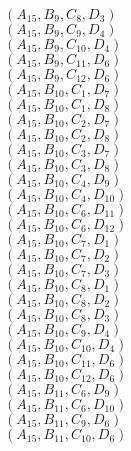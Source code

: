 \documentclass[14pt]{article}
\begin{document}
    $({A}_{15}, {B}_{9}, {C}_{8}, {D}_{3}) $ \\ 
    $({A}_{15}, {B}_{9}, {C}_{9}, {D}_{4}) $ \\ 
    $({A}_{15}, {B}_{9}, {C}_{10}, {D}_{4}) $ \\ 
    $({A}_{15}, {B}_{9}, {C}_{11}, {D}_{6}) $ \\ 
    $({A}_{15}, {B}_{9}, {C}_{12}, {D}_{6}) $ \\ 
    $({A}_{15}, {B}_{10}, {C}_{1}, {D}_{7}) $ \\ 
    $({A}_{15}, {B}_{10}, {C}_{1}, {D}_{8}) $ \\ 
    $({A}_{15}, {B}_{10}, {C}_{2}, {D}_{7}) $ \\ 
    $({A}_{15}, {B}_{10}, {C}_{2}, {D}_{8}) $ \\ 
    $({A}_{15}, {B}_{10}, {C}_{3}, {D}_{7}) $ \\ 
    $({A}_{15}, {B}_{10}, {C}_{3}, {D}_{8}) $ \\ 
    $({A}_{15}, {B}_{10}, {C}_{4}, {D}_{9}) $ \\ 
    $({A}_{15}, {B}_{10}, {C}_{4}, {D}_{10}) $ \\ 
    $({A}_{15}, {B}_{10}, {C}_{6}, {D}_{11}) $ \\ 
    $({A}_{15}, {B}_{10}, {C}_{6}, {D}_{12}) $ \\ 
    $({A}_{15}, {B}_{10}, {C}_{7}, {D}_{1}) $ \\ 
    $({A}_{15}, {B}_{10}, {C}_{7}, {D}_{2}) $ \\ 
    $({A}_{15}, {B}_{10}, {C}_{7}, {D}_{3}) $ \\ 
    $({A}_{15}, {B}_{10}, {C}_{8}, {D}_{1}) $ \\ 
    $({A}_{15}, {B}_{10}, {C}_{8}, {D}_{2}) $ \\ 
    $({A}_{15}, {B}_{10}, {C}_{8}, {D}_{3}) $ \\ 
    $({A}_{15}, {B}_{10}, {C}_{9}, {D}_{4}) $ \\ 
    $({A}_{15}, {B}_{10}, {C}_{10}, {D}_{4}) $ \\ 
    $({A}_{15}, {B}_{10}, {C}_{11}, {D}_{6}) $ \\ 
    $({A}_{15}, {B}_{10}, {C}_{12}, {D}_{6}) $ \\ 
    $({A}_{15}, {B}_{11}, {C}_{6}, {D}_{9}) $ \\ 
    $({A}_{15}, {B}_{11}, {C}_{6}, {D}_{10}) $ \\ 
    $({A}_{15}, {B}_{11}, {C}_{9}, {D}_{6}) $ \\ 
    $({A}_{15}, {B}_{11}, {C}_{10}, {D}_{6}) $ \\ 
\end{document}
